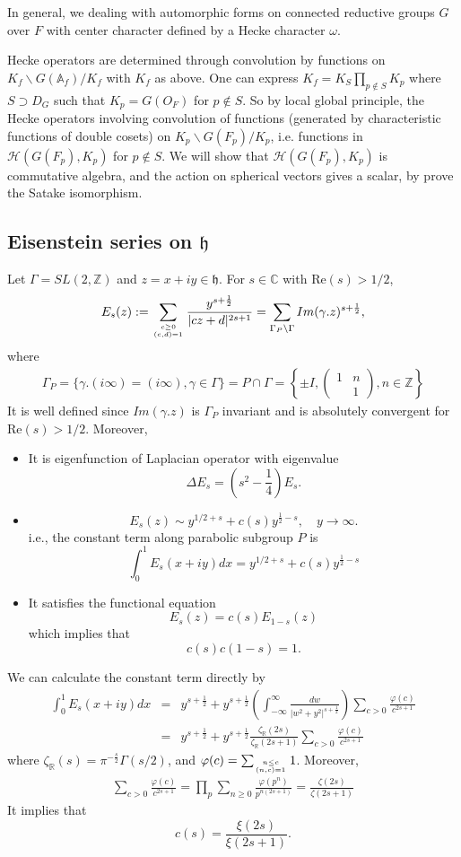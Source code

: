 \documentclass[11pt,reqno]{amsart}
\newcommand{\bna}{\begin{eqnarray*}}
\newcommand{\ena}{\end{eqnarray*}}
\newcommand{\bma}{\begin{pmatrix}}
\newcommand{\ema}{\end{pmatrix}}
\def\re{{\mathrm{Re}}}
\def\C{\mathbb{C}}
\def\A{\mathbb{A}}
\def\R{\mathbb{R}}
\def\Z{\mathbb{Z}}
\theoremstyle{definition}
\newcommand{\bit}{\begin{itemize}}
\newcommand{\eit}{\end{itemize}}
\begin{document}
\remark In general, we dealing with automorphic forms on connected reductive groups $G$ over $F$ with center character
defined by a Hecke character $\omega$.

Hecke operators are determined through convolution by functions on $K_f\backslash G(\A_f)/K_f$ with $K_f$ as above.
One can express $K_f=K_S\prod_{p\notin S}K_p$ where $S\supset D_G$ such that $K_p=G(O_F)$ for $p\notin S$.
So by local global principle, the Hecke operators involving convolution of functions
(generated by characteristic functions of double cosets) on $K_p\backslash G(F_p)/K_p$,
i.e. functions in $\mathcal H(G(F_p),K_p)$ for $p\notin S$.
We will show that $\mathcal H(G(F_p),K_p)$ is commutative algebra, and the action on spherical vectors
gives a scalar, by prove the Satake isomorphism.


\subsection{Eisenstein series on $\mathfrak h$}
Let $\Gamma=SL(2,\Z)$ and $z=x+iy\in\mathfrak h$. For $s\in\C$ with $\re(s)>1/2$,
\bna
E_s(z):=\sum_{c\geq 0\atop{(c,d)=1}} \frac{y^{s+\frac{1}{2}}}{|cz+d|^{2s+1}}=\sum_{\Gamma_P\backslash \Gamma} Im(\gamma.z)^{s+\frac{1}{2}},
\ena
where
\bna
\Gamma_P=\{\gamma.(i\infty)=(i\infty),\gamma\in\Gamma\}=P\cap \Gamma=\left\{\pm I,\bma 1&n\\&1\ema,n\in \Z\right\}
\ena
It is well defined since $Im(\gamma.z)$ is $\Gamma_P$ invariant
and is absolutely convergent for $\re(s)>1/2$. Moreover,
\bit
\item It is eigenfunction of Laplacian operator with eigenvalue
$$
\Delta E_s=(s^2-\frac{1}{4})E_s.
$$
\item
$$
E_s(z)\sim y^{1/2+s}+c(s)y^{\frac{1}{2}-s},\quad y\rightarrow \infty.
$$
i.e., the constant term along parabolic subgroup $P$ is
$$
\int_0^1 E_s(x+iy)dx=y^{1/2+s}+c(s)y^{\frac{1}{2}-s}
$$
\item It satisfies the functional equation
$$
E_s(z)=c(s)E_{1-s}(z)
$$
which implies that
$$
c(s)c(1-s)=1.
$$
\eit
We can calculate the constant term directly by
\bna
\int_0^1 E_s(x+iy)dx
&=& y^{s+\frac{1}{2}}+y^{s+\frac{1}{2}}\left(\int_{-\infty}^\infty\frac{dw}{|w^2+y^2|^{s+\frac{1}{2}}}\right)\sum_{c>0}\frac{\varphi(c)}{c^{2s+1}}\\
&=& y^{s+\frac{1}{2}}+y^{s+\frac{1}{2}}\frac{\zeta_\R(2s)}{\zeta_\R(2s+1)}\sum_{c>0}\frac{\varphi(c)}{c^{2s+1}}
\ena
where $\zeta_\R(s)=\pi^{-\frac{s}{2}}\Gamma(s/2)$, and $\varphi(c)=\sum_{n\leq c\atop{(n,c)=1}}1$. Moreover,
\bna
\sum_{c>0}\frac{\varphi(c)}{c^{2s+1}}=\prod_p \sum_{n\geq 0}\frac{\varphi(p^n)}{p^{n(2s+1)}}
=\frac{\zeta(2s)}{\zeta(2s+1)}
\ena
It implies that
$$
c(s)=\frac{\xi(2s)}{\xi(2s+1)}.
$$
\end{document}

